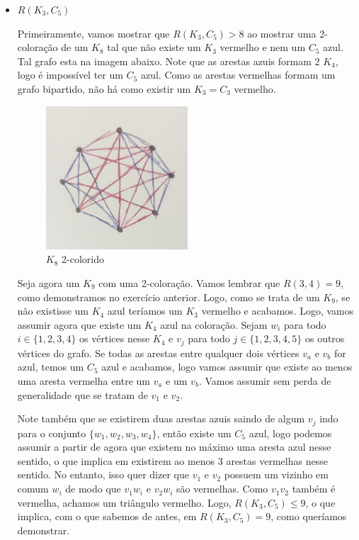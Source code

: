 \documentclass{article}
\begin{document}
\begin{itemize}
\begin{itemize}
		      \item \(R(K_3, C_5)\)

		            Primeiramente, vamos mostrar que \(R(K_3, C_5) > 8\) ao mostrar uma 2-coloração de um \(K_8\) tal que não existe um
		            \(K_3\) vermelho e nem um \(C_5\) azul. Tal grafo esta na imagem abaixo. Note que as arestas azuis formam 2 \(K_4\), logo é impossível
		            ter um \(C_5\) azul. Como as arestas vermelhas formam um grafo bipartido, não há como existir um \(K_3 = C_3\) vermelho.

		            \begin{figure}[H]
			            \centering
			            \includegraphics[width=0.5\textwidth]{images/k8.jpeg}
			            \caption{\(K_8\) 2-colorido}
		            \end{figure}

		            Seja agora um \(K_9\) com uma 2-coloração. Vamos lembrar que \(R(3, 4) = 9\), como demonstramos no exercício anterior. Logo, como se trata
		            de um \(K_9\), se não existisse um \(K_4\) azul teríamos um \(K_3\) vermelho e acabamos. Logo, vamos assumir agora que existe um \(K_4\) azul na coloração.
		            Sejam \(w_i\) para todo \(i \in \{1, 2, 3, 4\}\) os vértices nesse \(K_4\) e \(v_j\) para todo \(j \in \{1, 2, 3, 4, 5\}\) os outros vértices
		            do grafo. Se todas as arestas entre qualquer dois vértices \(v_a\) e \(v_b\) for azul, temos um \(C_5\) azul e acabamos, logo vamos assumir que existe ao menos uma aresta vermelha
		            entre um \(v_a\) e um \(v_b\). Vamos assumir sem perda de generalidade que se tratam de \(v_1\) e \(v_2\).

		            Note também que se existirem duas arestas azuis saindo de algum \(v_j\) indo para o conjunto \(\{w_1, w_2, w_3, w_4\}\), então existe um \(C_5\) azul,
		            logo podemos assumir a partir de agora que existem no máximo uma aresta azul nesse sentido, o que implica em existirem ao menos 3 arestas vermelhas nesse sentido. No entanto,
		            isso quer dizer que \(v_1\) e \(v_2\) possuem um vizinho em comum \(w_i\) de modo que \(v_1w_i\) e \(v_2w_i\) são vermelhas. Como \(v_1v_2\) também é vermelha,
		            achamos um triângulo vermelho. Logo, \(R(K_3, C_5) \leq 9\), o que implica, com o que sabemos de antes, em \(R(K_3, C_5) = 9\), como queríamos demonstrar.


\end{itemize}
\end{itemize}
\end{document}
